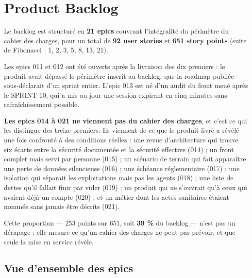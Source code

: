 \chapter{Product Backlog}
\label{chap:backlog}

Le backlog est structuré en \textbf{21 epics} couvrant l'intégralité du
périmètre du cahier des charges, pour un total de \textbf{92 user stories}
et \textbf{651 story points} (suite de Fibonacci : 1, 2, 3, 5, 8, 13, 21).

Les epics 011 et 012 ont été ouverts après la livraison des dix premiers : le
produit avait dépassé le périmètre inscrit au backlog, que la roadmap publiée
sous-déclarait d'un sprint entier. L'epic 013 est né d'un audit du front mené
après le SPRINT-10, qui a mis au jour une session expirant en cinq minutes sans
rafraîchissement possible.

\textbf{Les epics 014 à 021 ne viennent pas du cahier des charges}, et c'est ce
qui les distingue des treize premiers. Ils viennent de ce que le produit livré a
révélé une fois confronté à des conditions réelles : une revue d'architecture
qui trouve six écarts entre la sécurité documentée et la sécurité effective
(014) ; un front complet mais servi par personne (015) ; un scénario de terrain
qui fait apparaître une perte de données silencieuse (016) ; une échéance
réglementaire (017) ; une isolation qui séparait les exploitations mais pas les
agents (018) ; une liste de dettes qu'il fallait finir par vider (019) ; un produit
qui ne s'ouvrait qu'à ceux qui avaient déjà un compte (020) ; et un métier dont
les actes sanitaires étaient nommés sans jamais être décrits (021).

Cette proportion --- 253 points sur 651, soit \textbf{39 \%} du backlog --- n'est
pas un dérapage : elle mesure ce qu'un cahier des charges ne peut pas prévoir, et
que seule la mise en service révèle.

\section{Vue d'ensemble des epics}

